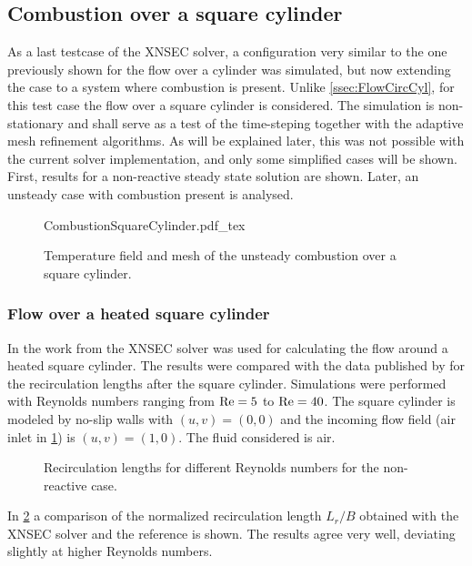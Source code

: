 \FloatBarrier
\subsection{Combustion over a square cylinder}
As a last testcase of the XNSEC solver, a configuration very similar to the one previously shown for the flow over a cylinder was simulated, but now extending the case to a system where combustion is present. 
Unlike \cref{ssec:FlowCircCyl}, for this test case the flow over a square cylinder is considered.  The simulation is non-stationary and shall serve as a test of the time-steping together with the adaptive mesh refinement algorithms. As will be explained later, this was not possible with the current solver implementation, and only some simplified cases will be shown.  First, results for a non-reactive steady state solution are shown. Later, an unsteady case with combustion present is analysed.
\begin{figure}[h]
	\begin{center}
		\def\svgwidth{0.8\textwidth}
		{CombustionSquareCylinder.pdf_tex}
		\caption{Temperature field and mesh of the unsteady combustion over a square cylinder.}
		\label{fig:CombustionSquareCylinder}
	\end{center}
\end{figure}
\subsubsection{Flow over a heated square cylinder}
In the work from \textcite{miaoHighOrderSimulationLowMachFlows2022} the XNSEC solver was used for calculating the flow around a heated square cylinder. The results were compared with the data published by \textcite{sharmaHEATFLUIDFLOW2004} for the recirculation lengths after the square cylinder. Simulations were performed with Reynolds numbers ranging from $\text{Re} = 5$ to $\text{Re} = 40$. The square cylinder is modeled by no-slip walls with $(u,v) = (0,0)$ and the incoming flow field (air inlet in \cref{fig:CombustionSquareCylinder}) is $(u,v) = (1,0)$. The fluid considered is air. 
\begin{figure}[b!]
	\centering
	\caption{Recirculation lengths for different Reynolds numbers for the non-reactive case.}
	\label{fig:RecirculationLength}
\end{figure}
In \cref{fig:RecirculationLength} a comparison of the normalized recirculation length $L_r/B$ obtained with the XNSEC solver and the reference is shown. The results agree very well, deviating slightly at higher Reynolds numbers.

